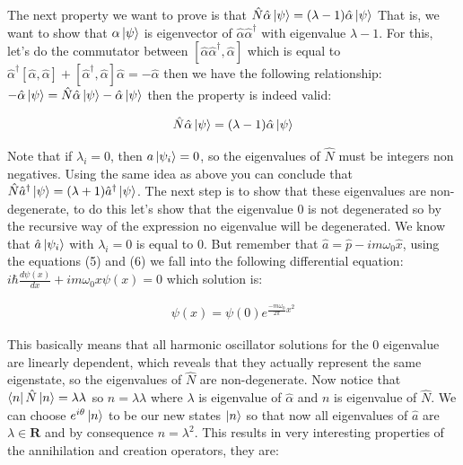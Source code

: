 \documentclass[
  journal=largetwo,
  year=2023,
]{cup-journal}
\begin{document}
The next property we want to prove is that \(\hat{N}\hat{\alpha}\ket{\psi} = (\lambda-1)\hat{\alpha}\ket{\psi}\) That is, we want to show that \(\alpha\ket{\psi}\) is eigenvector of \(\hat{\alpha}\hat{\alpha}^{\dag}\) with eigenvalue \(\lambda-1\). For this, let's do the commutator between \([\hat{\alpha}\hat{\alpha}^{\dag}, \hat{\alpha}]\) which is equal to \(\hat{\alpha}^{\dag}[\hat{\alpha}, \hat{\alpha}] + [\hat{\alpha}^{\dag}, \hat{\alpha}]\hat{\alpha} = -\hat{\alpha}\) then we have the following relationship: \(-\hat{\alpha}\ket{\psi} = \hat{N}\hat{\alpha}\ket{\psi} - \hat{\alpha}\ket{\psi} \) then the property is indeed valid:

\begin{equation}
  \begin{aligned}\label{eq:14.1}
    \hat{N}\hat{\alpha}\ket{\psi} = (\lambda-1)\hat{\alpha}\ket{\psi}
  \end{aligned}
\end{equation}


Note that if \(\lambda_i = 0\), then \(a\ket{\psi_i} = 0\), so the eigenvalues of \(\hat{N}\) must be integers non negatives. Using the same idea as above you can conclude that \(\hat{N}\hat{a}^{\dag}\ket{\psi} = (\lambda+1)\hat{a}^{\dag}\ket{\psi}\). The next step is to show that these eigenvalues are non-degenerate, to do this let's show that the eigenvalue 0 is not degenerated so by the recursive way of the expression no eigenvalue will be degenerated. We know that \(\hat{a}\ket{\psi_i}\) with \(\lambda_i = 0\) is equal to \(0\). But remember that \(\hat{a} = \hat{p} - im\omega_0\hat{x}\), using the equations (5) and (6) we fall into the following differential equation: \(i\hbar\frac{d\psi(x)}{dx} + im\omega_0 x\psi(x) = 0\) which solution is:

\begin{equation}
  \begin{aligned}\label{eq:14.2}
    \psi(x) = \psi(0)e^{\frac{-m\omega_0}{2\pi}x^2}
  \end{aligned}
\end{equation}


This basically means that all harmonic oscillator solutions for the 0 eigenvalue are linearly dependent, which reveals that they actually represent the same eigenstate, so the eigenvalues of \(\hat{N}\) are non-degenerate. Now notice that \(\bra{n}\hat{N}\ket{n} = \lambda\lambda^{}\) so \(n = \lambda\lambda{}\) where \(\lambda\) is eigenvalue of \(\hat{\alpha}\) and \(n\) is eigenvalue of \(\hat{N}\). We can choose \(e^{i\theta}\ket{n}\) to be our new states \(\ket{n}\) so that now all eigenvalues of \(\hat{a}\) are \(\lambda \in \textbf{R}\) and by consequence \(n = \lambda^2\). This results in very interesting properties of the annihilation and creation operators, they are:
\end{document}
